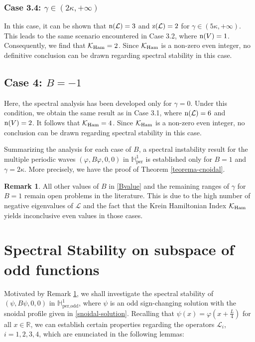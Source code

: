 \documentclass[10pt,reqno,a4paper]{amsart} %
\theoremstyle{definition} %
\numberwithin{equation}{section}
\numberwithin{figure}{section}
\newtheorem{remark}[theorem]{Remark}
\begin{document}
\subsubsection*{Case 3.4: $\gamma \in (2\kappa, +\infty)$}
In this case, it can be shown that ${\rm n}(\mathcal{L}) = 3$ and ${\rm z}(\mathcal{L}) = 2$ for $\gamma \in (5\kappa, +\infty)$. This leads to the same scenario encountered in Case 3.2, where ${\rm n}(V) = 1$. Consequently, we find that $\mathcal{K}_{\rm Ham} = 2$. Since $\mathcal{K}_{\rm Ham}$ is a non-zero even integer, no definitive conclusion can be drawn regarding spectral stability in this case.

\subsection*{Case 4: $B = -1$} 
Here, the spectral analysis has been developed only for $\gamma = 0$. Under this condition, we obtain the same result as in Case 3.1, where ${\rm n}(\mathcal{L}) = 6$ and ${\rm n}(V) = 2$. It follows that $\mathcal{K}_{\rm Ham} = 4$. Since $\mathcal{K}_{\rm Ham}$ is a non-zero even integer, no conclusion can be drawn regarding spectral stability in this case.

Summarizing the analysis for each case of $B$, a spectral instability result for the multiple periodic waves $(\varphi, B\varphi, 0, 0)$ in $\mathbb{H}^1_{\text{per}}$ is established only for $B=1$ and $\gamma = 2\kappa$. More precisely, we have the proof of Theorem \ref{teorema-cnoidal}.

\begin{remark}\label{rmk1}
    All other values of $B$ in  \eqref{Bvalue} and the remaining ranges of $\gamma$ for $B = 1$ remain open problems in the literature. This is due to the high number of negative eigenvalues of $\mathcal{L}$ and the fact that the Krein Hamiltonian Index $\mathcal{K}_{\rm Ham}$ yields inconclusive even values in those cases.
\end{remark}

\vspace{0.5cm}
\section{Spectral Stability on subspace of odd functions}\label{spectral-stability-odd-space}
Motivated by Remark \ref{rmk1}, we shall investigate the spectral stability of $(\psi, B\psi, 0, 0)$ in $\mathbb{H}^1_{\text{per,odd}}$, where $\psi$ is an odd sign-changing solution with the snoidal profile given in \eqref{snoidal-solution}. Recalling that $\psi(x) = \varphi\left( x + \tfrac{L}{4} \right)$ for all $x \in \mathbb{R}$, we can establish certain properties regarding the operators $\mathcal{L}_i$, $i=1,2,3,4$, which are enunciated in the following lemmas:
\end{document}
